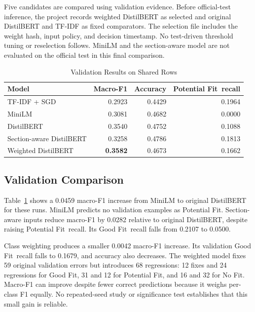 \documentclass[conference,a4paper]{IEEEtran}
\newcommand{\GF}{Good Fit}
\newcommand{\PF}{Potential Fit}
\newcommand{\NF}{No Fit}
\begin{document}
Five candidates are compared using validation evidence. Before official-test inference, the project records weighted DistilBERT as selected and original DistilBERT and TF-IDF as fixed comparators. The selection file includes the weight hash, input policy, and decision timestamp. No test-driven threshold tuning or reselection follows. MiniLM and the section-aware model are not evaluated on the official test in this final comparison.

\begin{table}[t]
\caption{Validation Results on Shared Rows}
\label{tab:validation}
\centering\footnotesize
\setlength{\tabcolsep}{4pt}
\begin{tabular}{lrrr}
\toprule
Model & Macro-F1 & Accuracy & \PF\ recall\\
\midrule
TF-IDF + SGD & 0.2923 & 0.4429 & 0.1964\\
MiniLM & 0.3081 & 0.4682 & 0.0000\\
DistilBERT & 0.3540 & 0.4752 & 0.1088\\
Section-aware DistilBERT & 0.3258 & 0.4786 & 0.1813\\
Weighted DistilBERT & \textbf{0.3582} & 0.4673 & 0.1662\\
\bottomrule
\end{tabular}
\end{table}

\subsection{Validation Comparison}
Table~\ref{tab:validation} shows a 0.0459 macro-F1 increase from MiniLM to original DistilBERT for these runs. MiniLM predicts no validation examples as \PF. Section-aware inputs reduce macro-F1 by 0.0282 relative to original DistilBERT, despite raising \PF\ recall. Its \GF\ recall falls from 0.2107 to 0.0500.

Class weighting produces a smaller 0.0042 macro-F1 increase. Its validation \GF\ recall falls to 0.1679, and accuracy also decreases. The weighted model fixes 59 original validation errors but introduces 68 regressions: 12 fixes and 24 regressions for \GF, 31 and 12 for \PF, and 16 and 32 for \NF. Macro-F1 can improve despite fewer correct predictions because it weighs per-class F1 equally. No repeated-seed study or significance test establishes that this small gain is reliable.
\end{document}
